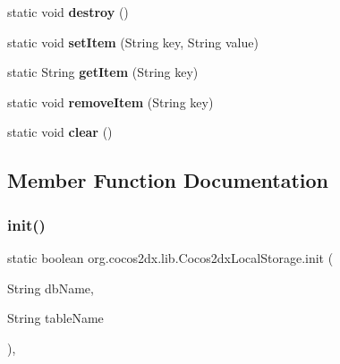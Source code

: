\begin{DoxyCompactItemize}
\item 
\mbox{\label{classorg_1_1cocos2dx_1_1lib_1_1Cocos2dxLocalStorage_a0159096cc6277723e7541cf657dd3199}} 
static void {\bfseries destroy} ()
\item 
\mbox{\label{classorg_1_1cocos2dx_1_1lib_1_1Cocos2dxLocalStorage_aa34d7d08c3fb172f4bacb6d7b043f411}} 
static void {\bfseries set\+Item} (String key, String value)
\item 
\mbox{\label{classorg_1_1cocos2dx_1_1lib_1_1Cocos2dxLocalStorage_afacdcae2a03124bded4397b2cd7b73ac}} 
static String {\bfseries get\+Item} (String key)
\item 
\mbox{\label{classorg_1_1cocos2dx_1_1lib_1_1Cocos2dxLocalStorage_ad36406f2809f5871b596fc40504199e1}} 
static void {\bfseries remove\+Item} (String key)
\item 
\mbox{\label{classorg_1_1cocos2dx_1_1lib_1_1Cocos2dxLocalStorage_aa82c6329449049025e9ead4ea7e920de}} 
static void {\bfseries clear} ()
\end{DoxyCompactItemize}


\subsection{Member Function Documentation}
\mbox{\label{classorg_1_1cocos2dx_1_1lib_1_1Cocos2dxLocalStorage_ac878c872715e26f8848749cdd8b0cede}} 
\subsubsection{\texorpdfstring{init()}{init()}\hspace{0.1cm}{\footnotesize\ttfamily [1/2]}}
{\footnotesize\ttfamily static boolean org.\+cocos2dx.\+lib.\+Cocos2dx\+Local\+Storage.\+init (\begin{DoxyParamCaption}\item[{String}]{db\+Name,  }\item[{String}]{table\+Name }\end{DoxyParamCaption})\hspace{0.3cm}{\ttfamily [inline]}, {\ttfamily [static]}}

